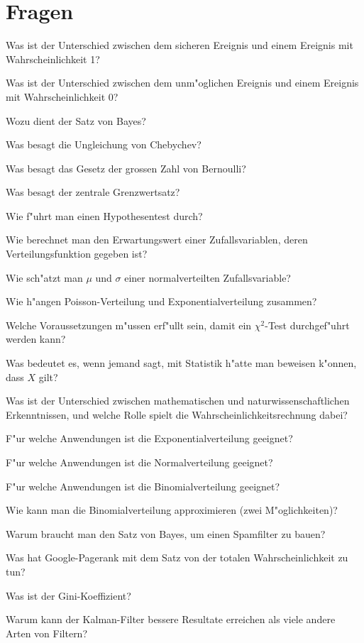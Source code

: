 \documentclass[a4paper,12pt,twocolumn]{article}
\begin{document}
\section{Fragen}
\begin{compactenum}
\item Was ist der Unterschied zwischen dem sicheren Ereignis und
einem Ereignis mit Wahrscheinlichkeit 1?
\item Was ist der Unterschied zwischen dem unm"oglichen Ereignis
und einem Ereignis mit Wahrscheinlichkeit 0?
\item Wozu dient der Satz von Bayes?
\item Was besagt die Ungleichung von Chebychev?
\item Was besagt das Gesetz der grossen Zahl von Bernoulli?
\item Was besagt der zentrale Grenzwertsatz?
\item Wie f"uhrt man einen Hypothesentest durch?
\item Wie berechnet man den Erwartungswert einer Zufallsvariablen, deren
Verteilungsfunktion gegeben ist?
\item Wie sch"atzt man $\mu$ und $\sigma$ einer normalverteilten
Zufallsvariable?
\item Wie h"angen Poisson-Verteilung und Exponentialverteilung zusammen?
\item Welche Voraussetzungen m"ussen erf"ullt sein, damit ein $\chi^2$-Test
durchgef"uhrt werden kann?
\item Was bedeutet es, wenn jemand sagt, mit Statistik h"atte man beweisen
k"onnen, dass $X$ gilt?
\item Was ist der Unterschied zwischen mathematischen und
naturwissenschaftlichen Erkenntnissen, und welche Rolle spielt die
Wahrscheinlichkeitsrechnung dabei?
\item F"ur welche Anwendungen ist die Exponentialverteilung geeignet?
\item F"ur welche Anwendungen ist die Normalverteilung geeignet?
\item F"ur welche Anwendungen ist die Binomialverteilung geeignet?
\item Wie kann man die Binomialverteilung approximieren (zwei M"oglichkeiten)?
\item Warum braucht man den Satz von Bayes, um einen Spamfilter zu bauen?
\item Was hat Google-Pagerank mit dem Satz von der totalen Wahrscheinlichkeit
zu tun?
\item Was ist der Gini-Koeffizient?
\item Warum kann der Kalman-Filter bessere Resultate erreichen als viele
andere Arten von Filtern?
\end{compactenum}
\end{document}
